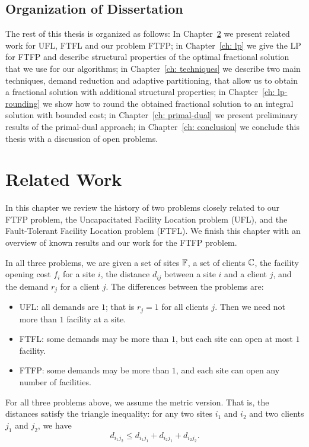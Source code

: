 \documentclass[oneside,final]{ucr}
\begin{document}
\section{Organization of Dissertation}
The rest of this thesis is organized as follows: In
Chapter~\ref{ch: related_work} we present related work for
UFL, FTFL and our problem FTFP; in Chapter~\ref{ch: lp} we
give the LP for FTFP and describe structural properties of
the optimal fractional solution that we use for our
algorithms; in Chapter~\ref{ch: techniques} we describe two
main techniques, demand reduction and adaptive partitioning,
that allow us to obtain a fractional solution with
additional structural properties; in Chapter~\ref{ch:
  lp-rounding} we show how to round the obtained fractional
solution to an integral solution with bounded cost; in
Chapter~\ref{ch: primal-dual} we present preliminary results
of the primal-dual approach; in Chapter~\ref{ch: conclusion}
we conclude this thesis with a discussion of open problems.


\chapter{Related Work} \label{ch: related_work}

In this chapter we review the history of two problems
closely related to our FTFP problem, the Uncapacitated
Facility Location problem (UFL), and the Fault-Tolerant
Facility Location problem (FTFL).  We finish this chapter
with an overview of known results and our work for the FTFP
problem.

In all three problems, we are given a set of sites
$\mathbb{F}$, a set of clients $\mathbb{C}$, the facility
opening cost $f_i$ for a site $i$, the distance $d_{ij}$
between a site $i$ and a client $j$, and the demand $r_j$
for a client $j$. The differences between the problems are:
\begin{itemize}
\item{UFL}: all demands are $1$; that is $r_j=1$ for all
  clients $j$. Then we need not more than $1$ facility at a
  site.
\item{FTFL}: some demands may be more than $1$, but
  each site can open at most $1$ facility.
\item{FTFP}: some demands may be more than $1$, and each site
  can open any number of facilities.
\end{itemize}
For all three problems above, we assume the metric
version. That is, the distances satisfy the triangle
inequality: for any two sites $i_1$ and $i_2$ and two
clients $j_1$ and $j_2$, we have
\begin{equation*}
  d_{i_1 j_2} \leq d_{i_1 j_1} + d_{i_2 j_1} + d_{i_2 j_2}.
\end{equation*}
\end{document}
